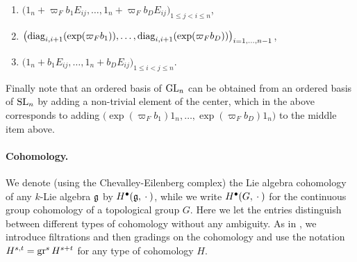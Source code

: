\begin{enumerate}[$\bullet$]
  \item $\bigl( 1_{n}+\varpi_{F}b_{1}E_{ij}, \dotsc, 1_{n}+\varpi_{F}b_{D}E_{ij} \bigr)_{1 \leq j < i \leq n}$,
  \item $\bigl( \operatorname{diag}_{i,i+1}(\exp(\varpi_{F}b_{1})), \dotsc, \operatorname{diag}_{i,i+1}(\exp(\varpi_{F}b_{D})) \bigr)_{i=1,\dotsc,n-1}$,
  \item $\bigl( 1_{n}+b_{1}E_{ij}, \dotsc, 1_{n}+b_{D}E_{ij} \bigr)_{1 \leq i < j \leq n}$.
\end{enumerate}

Finally note that an ordered basis of $\operatorname{GL}_{n}$ can be obtained from an ordered basis of $\operatorname{SL}_{n}$ by adding a non-trivial element of the center, which in the above corresponds to adding $\bigl(  \exp(\varpi_{F}b_{1})1_{n}, \dotsc, \exp(\varpi_{F}b_{D})1_{n} \bigr)$ to the middle item above.

\paragraph{Cohomology.} We denote (using the Chevalley-Eilenberg complex) the Lie algebra cohomology of any $k$-Lie algebra $\mathfrak{g}$ by $H^{\bullet}(\mathfrak{g}, \:\cdot\:)$, while we write $H^{\bullet}(G,\:\cdot\:)$ for the continuous group cohomology of a topological group $G$. Here we let the entries distinguish between different types of cohomology without any ambiguity. As in , we introduce filtrations and then gradings on the cohomology and use the notation $H^{s,t} = \operatorname{gr}^{s}H^{s+t}$ for any type of cohomology $H$.

